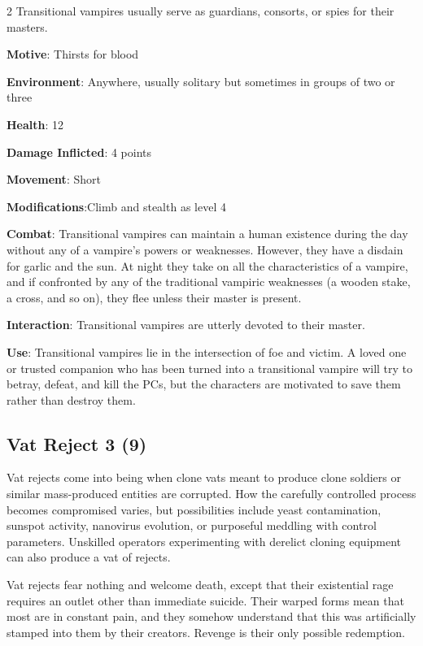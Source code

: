 \begin{multicols}{2}
Transitional vampires usually serve as guardians, consorts, or spies for their masters.

\textbf{Motive}: Thirsts for blood

\textbf{Environment}: Anywhere, usually solitary but sometimes in groups of two or three

\textbf{Health}: 12

\textbf{Damage Inflicted}: 4 points

\textbf{Movement}: Short

\textbf{Modifications}:Climb and stealth as level 4

\textbf{Combat}: Transitional vampires can maintain a human existence during the day without any of a vampire’s powers or weaknesses. However, they have a disdain for garlic and the sun. At night they take on all the characteristics of a vampire, and if confronted by any of the traditional vampiric weaknesses (a wooden stake, a cross, and so on), they flee unless their master is present.

\textbf{Interaction}: Transitional vampires are utterly devoted to their master. 

\textbf{Use}: Transitional vampires lie in the intersection of foe and victim. A loved one or trusted companion who has been turned into a transitional vampire will try to betray, defeat, and kill the PCs, but the characters are motivated to save them rather than destroy them.

\subsection{Vat Reject	3 (9)}

Vat rejects come into being when clone vats meant to produce clone soldiers or similar mass-produced entities are corrupted. How the carefully controlled process becomes compromised varies, but possibilities include yeast contamination, sunspot activity, nanovirus evolution, or purposeful meddling with control parameters. Unskilled operators experimenting with derelict cloning equipment can also produce a vat of rejects.

Vat rejects fear nothing and welcome death, except that their existential rage requires an outlet other than immediate suicide. Their warped forms mean that most are in constant pain, and they somehow understand that this was artificially stamped into them by their creators. Revenge is their only possible redemption.


\end{multicols}
